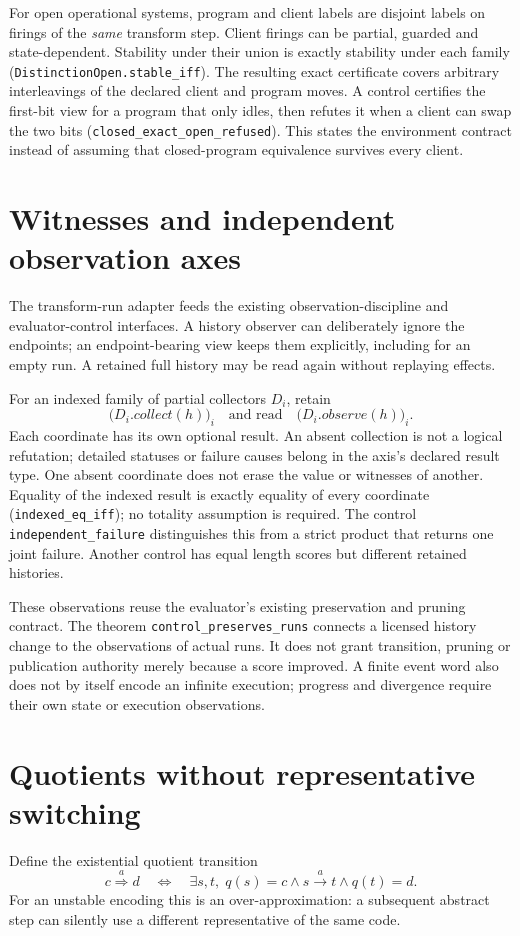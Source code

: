 \documentclass[11pt]{article}
\newcommand{\lean}[1]{\nolinkurl{#1}}
\begin{document}
For open operational systems, program and client labels are disjoint labels
on firings of the \emph{same} transform step. Client firings can be partial,
guarded and state-dependent. Stability under their union is exactly stability
under each family (\lean{DistinctionOpen.stable_iff}). The resulting exact
certificate covers arbitrary interleavings of the declared client and program
moves. A control certifies the first-bit view for a program that only idles,
then refutes it when a client can swap the two bits
(\lean{closed_exact_open_refused}). This states the environment contract
instead of assuming that closed-program equivalence survives every client.

\section{Witnesses and independent observation axes}
The transform-run adapter feeds the existing observation-discipline and
evaluator-control interfaces. A history observer can deliberately ignore the
endpoints; an endpoint-bearing view keeps them explicitly, including for an
empty run. A retained full history may be read again without replaying effects.

For an indexed family of partial collectors $D_i$, retain
\[
  \bigl(D_i.\mathit{collect}(h)\bigr)_i
  \quad\text{and read}\quad
  \bigl(D_i.\mathit{observe}(h)\bigr)_i.
\]
Each coordinate has its own optional result. An absent collection is not a
logical refutation; detailed statuses or failure causes belong in the axis's
declared result type. One absent coordinate does not erase the value or
witnesses of another. Equality of the indexed result is
exactly equality of every coordinate (\lean{indexed_eq_iff}); no totality
assumption is required. The control \lean{independent_failure} distinguishes
this from a strict product that returns one joint failure. Another control
has equal length scores but different retained histories.

These observations reuse the evaluator's existing preservation and pruning
contract. The theorem \lean{control_preserves_runs} connects a licensed
history change to the observations of actual runs. It does not grant transition,
pruning or publication authority merely because a score improved. A finite
event word also does not by itself encode an infinite execution; progress and
divergence require their own state or execution observations.

\section{Quotients without representative switching}
Define the existential quotient transition
\[
c\overset{a}{\Longrightarrow}d\quad\Longleftrightarrow\quad
\exists s,t,\;q(s)=c\land s\xrightarrow{a}t\land q(t)=d.
\]
For an unstable encoding this is an over-approximation: a subsequent abstract
step can silently use a different representative of the same code.
\end{document}
